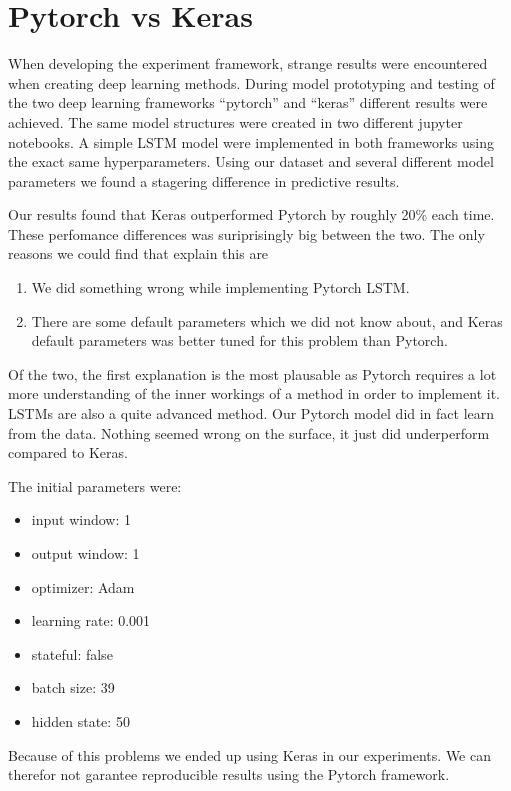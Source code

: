\section{Pytorch vs Keras}
\label{section:method:pytorch-vs-keras}


When developing the experiment framework, strange results were encountered when creating deep learning methods.
During model prototyping and testing of the two deep learning frameworks ``pytorch'' and ``keras''
different results were achieved.
The same model structures were created in two different jupyter notebooks.
A simple LSTM model were implemented in both frameworks using the exact same hyperparameters.
Using our dataset and several different model parameters we found a stagering difference in predictive results.

Our results found that Keras outperformed Pytorch by roughly 20\% each time.
These perfomance differences was suriprisingly big between the two.
The only reasons we could find that explain this are
\begin{enumerate}
  \item We did something wrong while implementing Pytorch LSTM.
  \item There are some default parameters which we did not know about, and Keras
        default parameters was better tuned for this problem than Pytorch.
\end{enumerate}

Of the two, the first explanation is the most plausable as Pytorch requires a lot more understanding
of the inner workings of a method in order to implement it.
LSTMs are also a quite advanced method. Our Pytorch model did in fact learn
from the data. Nothing seemed wrong on the surface, it just did underperform compared to Keras.

The initial parameters were:
\begin{itemize}
  \item input window: 1
  \item output window: 1
  \item optimizer: Adam
  \item learning rate: 0.001
  \item stateful: false
  \item batch size: 39
  \item hidden state: 50
\end{itemize}

Because of this problems we ended up using Keras in our experiments.
We can therefor not garantee reproducible results using the Pytorch framework.
